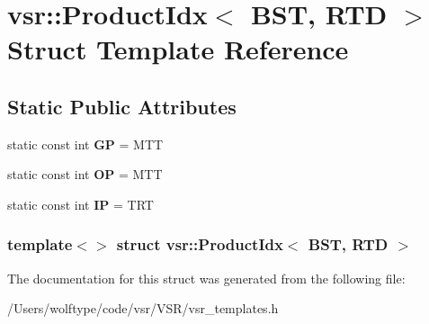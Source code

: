 \hypertarget{structvsr_1_1_product_idx_3_01_b_s_t_00_01_r_t_d_01_4}{\section{vsr\-:\-:Product\-Idx$<$ B\-S\-T, R\-T\-D $>$ Struct Template Reference}
\label{structvsr_1_1_product_idx_3_01_b_s_t_00_01_r_t_d_01_4}
}
\subsection*{Static Public Attributes}
\begin{DoxyCompactItemize}
\item 
\hypertarget{structvsr_1_1_product_idx_3_01_b_s_t_00_01_r_t_d_01_4_ad647b142b00e171696fcfb3e6712a2d3}{static const int {\bfseries G\-P} = M\-T\-T}\label{structvsr_1_1_product_idx_3_01_b_s_t_00_01_r_t_d_01_4_ad647b142b00e171696fcfb3e6712a2d3}

\item 
\hypertarget{structvsr_1_1_product_idx_3_01_b_s_t_00_01_r_t_d_01_4_aea538c5a40772f319ab2582b5cd7ed29}{static const int {\bfseries O\-P} = M\-T\-T}\label{structvsr_1_1_product_idx_3_01_b_s_t_00_01_r_t_d_01_4_aea538c5a40772f319ab2582b5cd7ed29}

\item 
\hypertarget{structvsr_1_1_product_idx_3_01_b_s_t_00_01_r_t_d_01_4_ab6ca8ae0e563bc73651b425c72019550}{static const int {\bfseries I\-P} = T\-R\-T}\label{structvsr_1_1_product_idx_3_01_b_s_t_00_01_r_t_d_01_4_ab6ca8ae0e563bc73651b425c72019550}

\end{DoxyCompactItemize}
\subsubsection*{template$<$$>$ struct vsr\-::\-Product\-Idx$<$ B\-S\-T, R\-T\-D $>$}



The documentation for this struct was generated from the following file\-:\begin{DoxyCompactItemize}
\item 
/\-Users/wolftype/code/vsr/\-V\-S\-R/vsr\-\_\-templates.\-h\end{DoxyCompactItemize}
